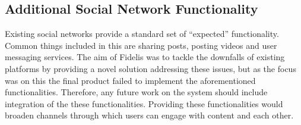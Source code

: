 \subsection{Additional Social Network Functionality}
Existing social networks provide a standard set of ``expected'' functionality. Common things included in this are sharing posts, posting videos and user messaging services. The aim of Fidelis was to tackle the downfalls of existing platforms by providing a novel solution addressing these issues, but as the focus was on this the final product failed to implement the aforementioned functionalities. Therefore, any future work on the system should include integration of the these functionalities. Providing these functionalities would broaden channels through which users can engage with content and each other.